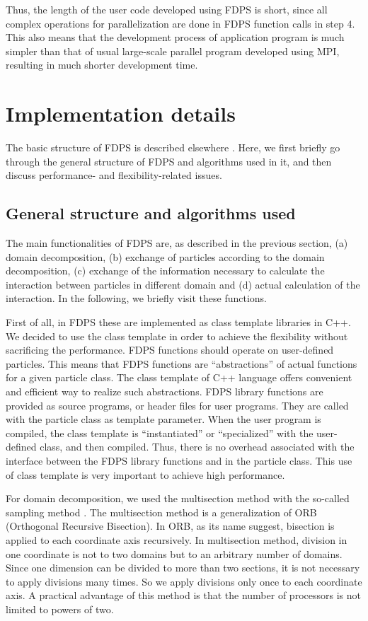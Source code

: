 \documentclass[dvipdfmx]{acm_proc_article-sp}
\begin{document}
Thus, the length of the user code developed using FDPS is short, since
all complex operations for parallelization are done in FDPS function
calls in step 4. This also means that the development process of
application program is much simpler than that of usual large-scale
parallel program developed using MPI, resulting in much shorter
development time.

\section{Implementation details}

The basic structure of FDPS is described elsewhere
\cite{2015iwasawa}. Here, we first briefly go through the
general structure of FDPS and algorithms used in it, and then discuss
performance- and flexibility-related issues.

\subsection{General structure  and algorithms used}

The main functionalities of FDPS are, as described in the previous
section, (a) domain decomposition, (b) exchange of particles according
to the domain decomposition, (c) exchange of the information necessary
to calculate the interaction between particles in different domain and
(d) actual calculation of the interaction. In the following, we
briefly visit these functions.

First of all, in FDPS these are implemented as class template 
libraries in C++. We decided to use the class template in order to
achieve the flexibility without sacrificing the performance. FDPS
functions should operate on user-defined particles. This means that
FDPS functions are ``abstractions'' of actual functions for a given
particle class. The class template of C++ language offers convenient
and efficient way to realize such abstractions. FDPS library functions
are provided as source programs, or header files for user programs. 
They are called with the particle class as template
parameter. When the user program is compiled, the class template is
``instantiated'' or ``specialized'' with the user-defined class, and
then compiled.  Thus, there is no overhead associated with the
interface between the FDPS library functions and in the particle
class. This use of class template is very important to achieve high
performance.

For domain decomposition, we used the multisection method
\cite{2004PASJ...56..521M} with the so-called sampling
method \cite{Blackston:1997:HPE:509593.509597}. The
multisection method is a generalization of ORB (Orthogonal Recursive
Bisection). In ORB, as its name suggest, bisection is applied to each
coordinate axis recursively. In multisection method, division in one
coordinate is not to two domains but to an arbitrary number of
domains. Since one dimension can be divided to more than two sections,
it is not necessary to apply divisions many times. So we apply
divisions only once to each coordinate axis. A practical advantage of
this method is that the number of processors is not limited to powers
of two.
\end{document}
